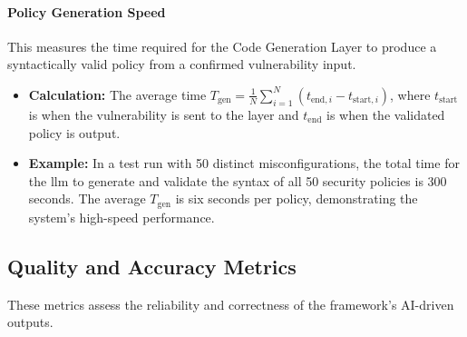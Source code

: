 \paragraph{Policy Generation Speed} This measures the time required for the Code Generation Layer to produce a syntactically valid policy from a confirmed vulnerability input.
\begin{itemize}
    \item \textbf{Calculation:} The average time \( T_{\text{gen}} = \frac{1}{N} \sum_{i=1}^{N} (t_{\text{end},i} - t_{\text{start},i}) \), where \( t_{\text{start}} \) is when the vulnerability is sent to the layer and \( t_{\text{end}} \) is when the validated policy is output.
    \item \textbf{Example:} In a test run with 50 distinct misconfigurations, the total time for the \gls{llm} to generate and validate the syntax of all 50 security policies is 300 seconds. The average \( T_{\text{gen}} \) is six seconds per policy, demonstrating the system's high-speed performance.
\end{itemize}


\subsection*{Quality and Accuracy Metrics}
These metrics assess the reliability and correctness of the framework's AI-driven outputs.

